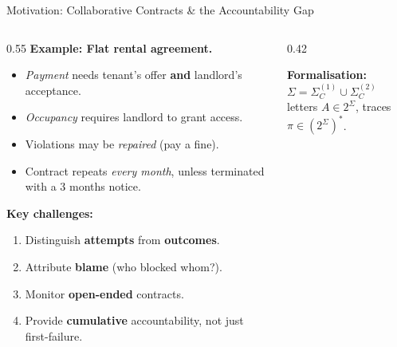 \documentclass[9pt,aspectratio=169]{beamer}
\begin{document}
\begin{frame}{Motivation: Collaborative Contracts \& the Accountability Gap}
\begin{columns}[T]
\begin{column}{0.55\textwidth}
  \small
  \textbf{Example:  Flat rental agreement.}
  \begin{itemize}
    \item \emph{Payment} needs tenant's offer \textbf{and} landlord's acceptance.
    \item \emph{Occupancy} requires landlord to grant access.
    \item Violations may be \emph{repaired} (pay a fine).
    \item Contract repeats \emph{every month}, unless terminated with a 3 months notice.
  \end{itemize}

  \medskip
  \textbf{Key challenges:}
  \begin{enumerate}
    \item Distinguish \textbf{attempts} from \textbf{outcomes}.
    \item Attribute \textbf{blame} (who blocked whom?).
    \item Monitor \textbf{open-ended} contracts.
    \item Provide \textbf{cumulative} accountability, not just first-failure.
  \end{enumerate}
\end{column}
\begin{column}{0.42\textwidth}
  \centering

  \vspace{4mm}
  \small
  \textbf{Formalisation:}
  $\Sigma = \Sigma_C^{(1)} \cup \Sigma_C^{(2)}$\\
  letters $A \in 2^{\Sigma}$, traces $\pi \in (2^\Sigma)^*$.
\end{column}
\end{columns}
\end{frame}
\end{document}
